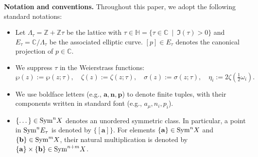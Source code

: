 \documentclass[11pt]{amsart}
\theoremstyle{remark}
\numberwithin{equation}{section}
\newcommand{\Sym}{{\rm Sym}}
\begin{document}
\begin{abstract}
Finally, we apply the asymptotic scaling technique, originally developed for the study of the addition map, to general symmetric elliptic equilibrium systems. This yields a rational limit that extracts the intersection multiplicities of local root clusters, and this structural rigidity completely solves the Treibich conjecture \cite{Treibich_2025} for $r=2$ symmetric pairs, including generalizations up to $r \leq 4$. Furthermore, we conjecture a general formula enumerating symmetric finite-gap KdV potentials for all $r$.
\end{abstract}

\maketitle



\tableofcontents


\maketitle

\sloppy

\vspace{1em}
\noindent \textbf{Notation and conventions.} Throughout this paper, we adopt the following standard notations:
\begin{itemize}[leftmargin=*]
    \item Let $\Lambda_\tau = \mathbb{Z} + \mathbb{Z}\tau$ be the lattice with $\tau \in \mathbb{H} = \{ \tau \in \mathbb{C} \ \mid \ \Im (\tau) >0 \}$ and $E_\tau = \mathbb{C}/\Lambda_\tau$ be the associated elliptic curve. $[p] \in E_\tau$ denotes the canonical projection of $p \in \mathbb{C}$.
    \item We suppress $\tau$ in the Weierstrass functions: 
    \[
    \wp(z) := \wp(z;\tau), \quad \zeta(z) := \zeta(z;\tau), \quad \sigma(z) := \sigma(z;\tau), \quad \eta_i := 2 \zeta( \tfrac{1}{2} \omega_i ).
    \]
    \item We use boldface letters (e.g., $\mathbf{a}, \mathbf{n}, \mathbf{p}$) to denote finite tuples, with their components written in standard font (e.g., $a_\mu, n_i, p_i$).
    \item $\{ \dots \} \in \Sym^n X$ denotes an unordered symmetric class. In particular, a point in $\Sym ^n E_{\tau}$ is denoted by $\{[\mathbf{a}]\}$. For elements $\{ \mathbf{a} \} \in \Sym^n X$ and $\{ \mathbf{b} \} \in \Sym^m X$, their natural multiplication is denoted by $\{ \mathbf{a} \} \times \{ \mathbf{b} \} \in \Sym^{n+m} X$. 
\end{itemize}
\end{document}
